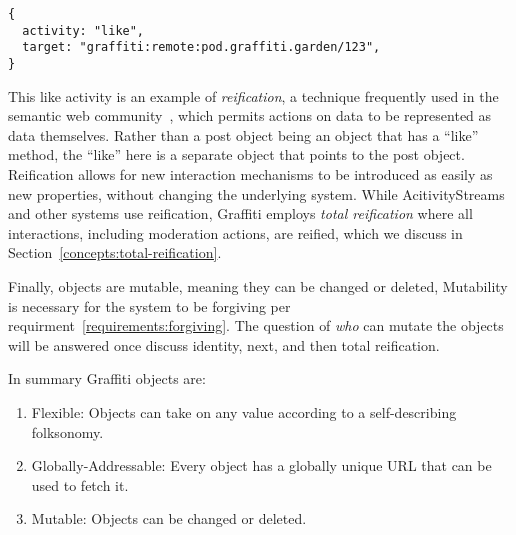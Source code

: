 \begin{verbatim}
{
  activity: "like",
  target: "graffiti:remote:pod.graffiti.garden/123",
}
\end{verbatim}

This like activity is an example of \emph{reification},
a technique frequently used in the semantic web community~\cite{rdfprimer},
which permits actions on data to be represented as data themselves.
Rather than a post object being an object that has a ``like'' method,
the ``like'' here is a separate object that points to the post object.
Reification allows for new interaction mechanisms to be introduced as easily as new properties,
without changing the underlying system.
While AcitivityStreams and other systems use reification,
Graffiti employs \emph{total reification} where
all interactions, including moderation actions, are reified,
which we discuss in
Section~\ref{concepts:total-reification}.

Finally, objects are mutable, meaning they can be changed or deleted,
Mutability is necessary for the system to be forgiving per requirment~\ref{requirements:forgiving}.
The question of \emph{who} can mutate the objects
will be answered once discuss identity, next, and then total reification.

In summary Graffiti objects are:

\begin{enumerate}
\item
Flexible: Objects can take on any value according to a self-describing folksonomy.
\item
Globally-Addressable: Every object has a globally unique URL that can be used to fetch it.
\item
Mutable: Objects can be changed or deleted.
\end{enumerate}


